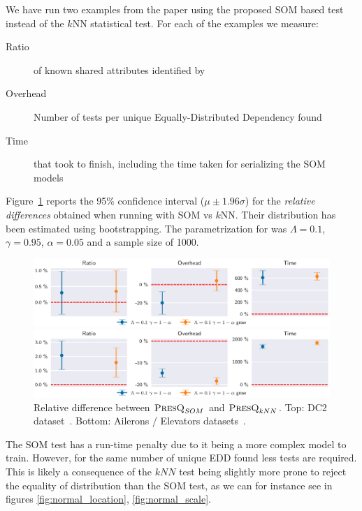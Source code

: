 We have run two examples from the \PresQ paper using the proposed SOM based test
instead of the $k$NN statistical test. For each of the examples we measure:

\begin{description}
    \item[Ratio] of known shared attributes identified by \PresQ
    \item[Overhead] Number of tests per unique Equally-Distributed Dependency found
    \item[Time] that took \PresQ to finish, including the time taken for serializing the SOM models
\end{description}

Figure~\ref{fig:presq_som} reports the 95\% confidence interval ($\mu \pm 1.96 \sigma$)
for the \emph{relative differences} obtained when running with SOM vs
$k$NN. Their distribution has been estimated using bootstrapping. The parametrization for
\PresQ was $\Lambda = 0.1$, $\gamma=0.95$, $\alpha=0.05$ and a sample size of 1000.

\begin{figure}[ht]
    \centering
    \includegraphics[width=\textwidth]{images/4_som/presq_som.eps}
    
    \includegraphics[width=\textwidth]{images/4_som/presq_som_aileron.eps}
    \caption{Relative difference between $\textsc{PresQ}_{SOM}$ and $\textsc{PresQ}_{kNN}$.
    Top: DC2 dataset~\cite{EuclidDesprez2020}.
    Bottom: Ailerons / Elevators datasets~\cite{alcala2011keel}.}
    \label{fig:presq_som}
\end{figure}

The SOM test has a run-time penalty due to it being a more complex model to train.
However, for the same number of unique EDD found less tests are required. This is likely a consequence of
the $kNN$ test being slightly more prone to reject the equality of distribution than the SOM
test, as we can for instance see in figures \ref{fig:normal_location}, \ref{fig:normal_scale}.

